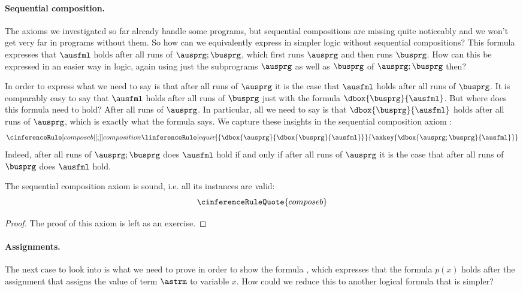 \documentclass[11pt,twoside]{scrartcl}
\begin{document}
\paragraph{Sequential composition.}

The axioms we investigated so far already handle some programs, but sequential compositions are missing quite noticeably and we won't get very far in programs without them.
So how can we equivalently express \m{\dbox{\ausprg;\busprg}{\ausfml}} in simpler logic without sequential compositions?
This formula expresses that $\ausfml$ holds after all runs of $\ausprg;\busprg$, which first runs $\ausprg$ and then runs $\busprg$.
How can this be expressed in an easier way in logic, again using just the subprograms $\ausprg$ as well as $\busprg$ of $\ausprg;\busprg$ then?

In order to express \m{\dbox{\ausprg;\busprg}{\ausfml}} what we need to say is that after all runs of $\ausprg$ it is the case that $\ausfml$ holds after all runs of $\busprg$.
It is comparably easy to say that $\ausfml$ holds after all runs of $\busprg$ just with the formula \(\dbox{\busprg}{\ausfml}\).
But where does this formula need to hold?
After all runs of $\ausprg$.
In particular, all we need to say is that \(\dbox{\busprg}{\ausfml}\) holds after all runs of $\ausprg$, which is exactly what the formula \m{\dbox{\ausprg}{\dbox{\busprg}{\ausfml}}} says.
We capture these insights in the sequential composition axiom :
\[
\cinferenceRule[composeb|$\dibox{{;}}$]{composition} %
{\linferenceRule[equiv]
  {\dbox{\ausprg}{\dbox{\busprg}{\ausfml}}}
  {\axkey{\dbox{\ausprg;\busprg}{\ausfml}}}
}{}%
\]
Indeed, after all runs of $\ausprg;\busprg$ does $\ausfml$ hold if and only if after all runs of $\ausprg$ it is the case that after all runs of $\busprg$ does $\ausfml$ hold.

\begin{theorem}
  The sequential composition axiom  is sound, i.e. all its instances are valid:
  \[
  \cinferenceRuleQuote{composeb}
  \]
\end{theorem}
\begin{proof}
The proof of this axiom is left as an exercise.
\end{proof}

\paragraph{Assignments.}

The next case to look into is what we need to prove in order to show the formula , which expresses that the formula $p(x)$ holds after the assignment  that assigns the value of term $\astrm$ to variable $x$.
How could we reduce this to another logical formula that is simpler?
\end{document}
